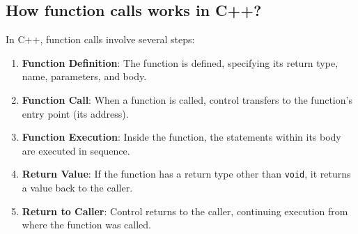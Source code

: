 \subsection{How function calls works in C++?}
In C++, function calls involve several steps:

\begin{enumerate}
    \item \textbf{Function Definition}: The function is defined, specifying its return type, name, parameters, and body. 
    \item \textbf{Function Call}: When a function is called, control transfers to the function's entry point (its address).
    \item \textbf{Function Execution}: Inside the function, the statements within its body are executed in sequence.
    \item \textbf{Return Value}: If the function has a return type other than \texttt{void}, it returns a value back to the caller.
    \item \textbf{Return to Caller}: Control returns to the caller, continuing execution from where the function was called.
\end{enumerate}